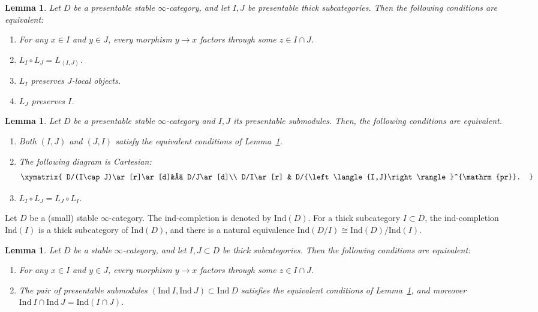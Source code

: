 \documentclass[11pt]{amsart}
\theoremstyle{definition}
\theoremstyle{plain}
\newtheorem{lem}[defn]{Lemma}
\theoremstyle{remark}
\newcommand{\Ind}{\mathrm{Ind}}
\newcommand{\mo}{\mathrm}
\newcommand{\ang}[1]{{\left\langle{#1}\right\rangle}}
\numberwithin{equation}{section}
\begin{document}
\begin{lem}\label{lem:composability_of_large_localization}
Let \(D\) be a presentable stable \(\infty\)-category, and let \(I,J\) be presentable thick subcategories.
Then the following conditions are equivalent:
\begin{enumerate}
\item For any \(x\in I\) and \(y\in J\), every morphism \(y\to x\) factors through some \(z\in I\cap J\).
\item \(L_I\circ L_J= L_{\ang{I,J}}\).
\item \(L_I\) preserves \(J\)-local objects.
\item \(L_J\) preserves \(I\).
\end{enumerate}
\end{lem}

\begin{lem}
Let \(D\) be a presentable stable \(\infty\)-category and \(I,J\) its presentable submodules.
Then, the following conditions are equivalent.
\begin{enumerate}
\item Both \((I,J)\) and \((J,I)\) satisfy the equivalent conditions of Lemma~\ref{lem:composability_of_large_localization}.
\item The following diagram is Cartesian:
\[\xymatrix{
D/(I\cap J)\ar[r]\ar[d]&  D/J\ar[d]\\
D/I\ar[r] & D/\ang{I,J}^{\mo{pr}}.
}\]
\item \(L_I\circ L_J= L_J\circ L_I\).
\end{enumerate}
\end{lem}

Let \(D\) be a (small) stable \(\infty\)-category.
The ind-completion is denoted by \(\Ind(D)\).
For a thick subcategory \(I\subset D\), the ind-completion \(\Ind(I)\) is a thick subcategory of \(\Ind(D)\), and there is a natural equivalence \(\Ind(D/I)\cong \Ind(D)/\Ind(I)\).

\begin{lem}\label{lem:composability_of_small_localization}
Let \(D\) be a stable \(\infty\)-category, and let \(I,J\subset D\) be thick subcategories.
Then the following conditions are equivalent:
\begin{enumerate}
\item For any \(x\in I\) and \(y\in J\), every morphism \(y\to x\) factors through some \(z\in I\cap J\).
\item The pair of presentable submodules \((\Ind~ I,\Ind~ J)\subset\Ind ~D\) satisfies the equivalent conditions of Lemma~\ref{lem:composability_of_large_localization}, and moreover \(\Ind ~I\cap \Ind ~J=\Ind(I\cap J)\).
\end{enumerate}
\end{lem}
\end{document}
